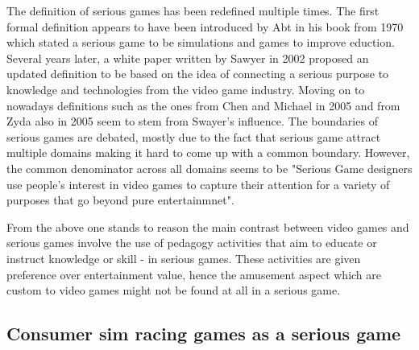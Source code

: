 \documentclass{article}
\begin{document}
The definition of serious games has been redefined multiple times. The first formal definition appears to have been introduced by Abt in his book from 1970 which stated a serious game to be simulations and games to improve eduction\cite{abt1970}. Several years later, a white paper written by Sawyer in 2002 proposed an updated definition to be based on the idea of connecting a serious purpose to knowledge and technologies from the video game industry\cite{michael2005serious}. Moving on to nowadays definitions such as the ones from Chen and Michael in 2005\cite{michael2005serious} and from Zyda also in 2005\cite{zyda2005visual} seem to stem from Swayer's influence. The boundaries of serious games are debated, mostly due to the fact that serious game attract multiple domains making it hard to come up with a common boundary. However, the common denominator across all domains seems to be "Serious Game designers use people's interest in video games to capture their attention for a variety of purposes that go beyond pure entertainmnet"\cite{djaouti2011classifying}.

From the above one stands to reason the main contrast between video games and serious games involve the use of pedagogy activities that aim to educate or instruct knowledge or skill -\cite{zyda2005visual} in serious games. These activities are given preference over entertainment value, hence the amusement aspect which are custom to video games might not be found at all in a serious game\cite{zyda2005visual}. 

\subsection{Consumer sim racing games as a serious game}
\end{document}
